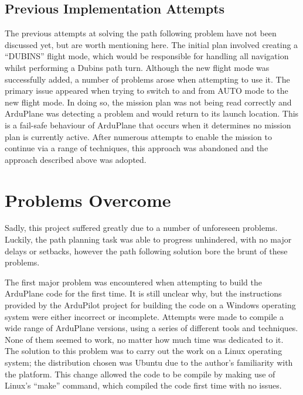 \subsection{Previous Implementation Attempts}
\label{planning:agile:previous}

The previous attempts at solving the path following problem have not been discussed yet, but are worth mentioning here. The initial plan involved creating a ``DUBINS'' flight mode, which would be responsible for handling all navigation whilst performing a Dubins path turn. Although the new flight mode was successfully added, a number of problems arose when attempting to use it. The primary issue appeared when trying to switch to and from AUTO mode to the new flight mode. In doing so, the mission plan was not being read correctly and ArduPlane was detecting a problem and would return to its launch location. This is a fail-safe behaviour of ArduPlane that occurs when it determines no mission plan is currently active. After numerous attempts to enable the mission to continue via a range of techniques, this approach was abandoned and the approach described above was adopted.

\section{Problems Overcome}
\label{planning:problems}

Sadly, this project suffered greatly due to a number of unforeseen problems. Luckily, the path planning task was able to progress unhindered, with no major delays or setbacks, however the path following solution bore the brunt of these problems. 

The first major problem was encountered when attempting to build the ArduPlane code for the first time. It is still unclear why, but the instructions provided by the ArduPilot project for building the code on a Windows operating system were either incorrect or incomplete. Attempts were made to compile a wide range of ArduPlane versions, using a series of different tools and techniques. None of them seemed to work, no matter how much time was dedicated to it. The solution to this problem was to carry out the work on a Linux operating system; the distribution chosen was Ubuntu due to the author's familiarity with the platform. This change allowed the code to be compile by making use of Linux's ``make'' command, which compiled the code first time with no issues. 

